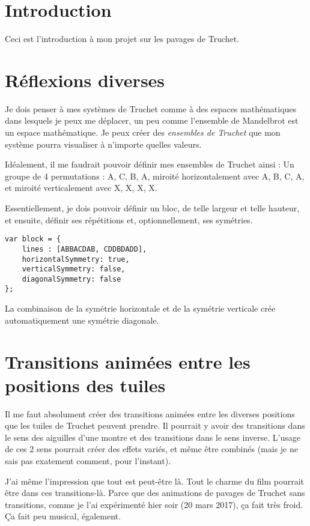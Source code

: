 
\section{Introduction}
Ceci est l'introduction à mon projet sur les pavages de Truchet.

\section{Réflexions diverses}

Je dois penser à mes systèmes de Truchet comme à des espaces mathématiques dans lesquels je peux me déplacer, un peu comme l'ensemble de Mandelbrot est un espace mathématique. Je peux créer des \textit{ensembles de Truchet} que mon système pourra visualiser à n'importe quelles valeurs.

Idéalement, il me faudrait pouvoir définir mes ensembles de Truchet ainsi :
Un groupe de 4 permutations : A, C, B, A, miroité horizontalement avec A, B, C, A, et miroité verticalement avec X, X, X, X.

Essentiellement, je dois pouvoir définir un bloc, de telle largeur et telle hauteur, et ensuite, définir ses répétitions et, optionnellement, ses symétries.

\begin{lstlisting}
var block = {
    lines : [ABBACDAB, CDDBDADD],
    horizontalSymmetry: true,
    verticalSymmetry: false,
    diagonalSymmetry: false
};
\end{lstlisting}

La combinaison de la symétrie horizontale et de la symétrie verticale crée automatiquement une symétrie diagonale.

\section{Transitions animées entre les positions des tuiles}
Il me faut absolument créer des transitions animées entre les diverses positions que les tuiles de Truchet peuvent prendre. Il pourrait y avoir des transitions dans le sens des aiguilles d'une montre et des transitions dans le sens inverse. L'usage de ces 2 sens pourrait créer des effets variés, et même être combinés (mais je ne sais pas exatement comment, pour l'instant).

J'ai même l'impression que tout est peut-être là. Tout le charme du film pourrait être dans ces transitions-là. Parce que des animations de pavages de Truchet sans transitions, comme je l'ai expérimenté hier soir (20 mars 2017), ça fait très froid. Ça fait peu musical, également.

